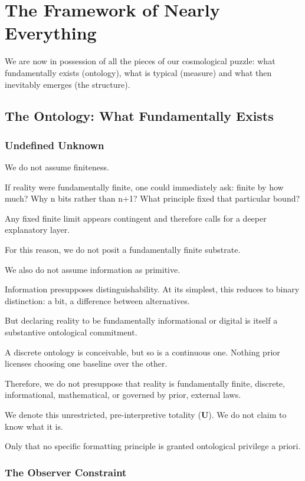 \chapter{The Framework of Nearly Everything}
\label{chap:framework-of-everything}

We are now in possession of all the pieces of our cosmological puzzle: what fundamentally exists (ontology), what is typical (measure) and
what then inevitably emerges (the structure).

\section{The Ontology: What Fundamentally Exists}

\subsection*{Undefined Unknown}

We do not assume finiteness.

If reality were fundamentally finite, one could immediately ask: finite by how much? Why n bits rather than n+1? What principle fixed that particular bound?

Any fixed finite limit appears contingent and therefore calls for a deeper explanatory layer.

For this reason, we do not posit a fundamentally finite substrate.


We also do not assume information as primitive.

Information presupposes distinguishability. At its simplest, this reduces to binary distinction: a bit, a difference between alternatives.

But declaring reality to be fundamentally informational or digital is itself a substantive ontological commitment.

A discrete ontology is conceivable, but so is a continuous one. Nothing prior licenses choosing one baseline over the other.

Therefore, we do not presuppose that reality is fundamentally finite, discrete, informational, mathematical, or governed by prior, external laws.

We denote this unrestricted, pre-interpretive totality ($\mathbf{U}$). We do not claim to know what it is.

Only that no specific formatting principle is granted ontological privilege a priori.


\subsection*{The Observer Constraint}

